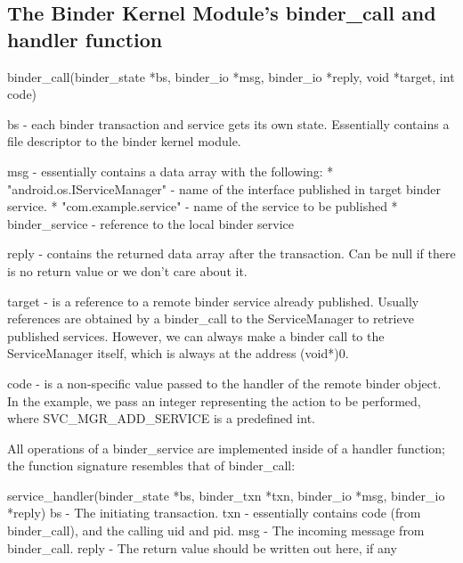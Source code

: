 \documentclass[prodmode]{acmlarge}
\begin{document}
\pagebreak[4]
\subsection{The Binder Kernel Module's binder\_call and handler function}
\label{app:binder_call}

\begin{snippet}
binder_call(binder_state *bs, binder_io *msg, binder_io *reply, void *target, int code)

bs -     each binder transaction and service gets its own state.
         Essentially contains a file descriptor to the binder kernel module.

msg -    essentially contains a data array with the following:
         * "android.os.IServiceManager" - name of the interface published in
                                          target binder service.
          * "com.example.service"       - name of the service to be  published
          * binder_service              - reference to the local binder
                                          service

reply -   contains the returned data array after the transaction. Can be null
          if there is no return value or we don't care about it.

target -  is a reference to a remote binder service already published. Usually
          references are obtained by a binder_call to the ServiceManager to retrieve
          published services. However, we can always make a binder call to the
          ServiceManager itself, which is always at the address (void*)0.

code -    is a non-specific value passed to the handler of the remote binder
          object. In the example, we pass an integer representing the action
          to be performed, where SVC_MGR_ADD_SERVICE is a predefined int.
\end{snippet}

All operations of a binder\_service are implemented inside of a handler function; the function signature resembles that of binder\_call:

\begin{snippet}
service_handler(binder_state *bs, binder_txn *txn,  binder_io *msg, binder_io *reply)
bs -      The initiating transaction.
txn -     essentially contains code (from binder_call), and the calling uid and pid.
msg -     The incoming message from binder_call.
reply -   The return value should be written out here, if any
\end{snippet}
\end{document}
